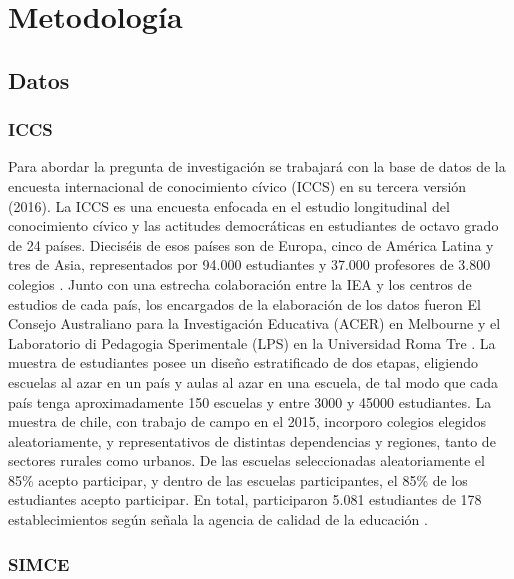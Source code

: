 \documentclass[12pt,twoside]{templates/facsothesis}
\begin{document}
\hypertarget{metodologuxeda}{%
\chapter{Metodología}\label{metodologuxeda}}

\hypertarget{datos}{%
\section{Datos}\label{datos}}

\hypertarget{iccs}{%
\subsection{ICCS}\label{iccs}}

Para abordar la pregunta de investigación se trabajará con la base de datos de la encuesta internacional de conocimiento cívico (ICCS) en su tercera versión (2016). La ICCS es una encuesta enfocada en el estudio longitudinal del conocimiento cívico y las actitudes democráticas en estudiantes de octavo grado de 24 países. Dieciséis de esos países son de Europa, cinco de América Latina y tres de Asia, representados por 94.000 estudiantes y 37.000 profesores de 3.800 colegios \citep{schulz_ICCS_2016}. Junto con una estrecha colaboración entre la IEA y los centros de estudios de cada país, los encargados de la elaboración de los datos fueron El Consejo Australiano para la Investigación Educativa (ACER) en Melbourne y el Laboratorio di Pedagogia Sperimentale (LPS) en la Universidad Roma Tre \citep{iea_International_2016}. La muestra de estudiantes posee un diseño estratificado de dos etapas, eligiendo escuelas al azar en un país y aulas al azar en una escuela, de tal modo que cada país tenga aproximadamente 150 escuelas y entre 3000 y 45000 estudiantes. La muestra de chile, con trabajo de campo en el 2015, incorporo colegios elegidos aleatoriamente, y representativos de distintas dependencias y regiones, tanto de sectores rurales como urbanos. De las escuelas seleccionadas aleatoriamente el 85\% acepto participar, y dentro de las escuelas participantes, el 85\% de los estudiantes acepto participar. En total, participaron 5.081 estudiantes de 178 establecimientos según señala la agencia de calidad de la educación \citep{ace_Informe_2018a}.

\hypertarget{simce}{%
\subsection{SIMCE}\label{simce}}
\end{document}
